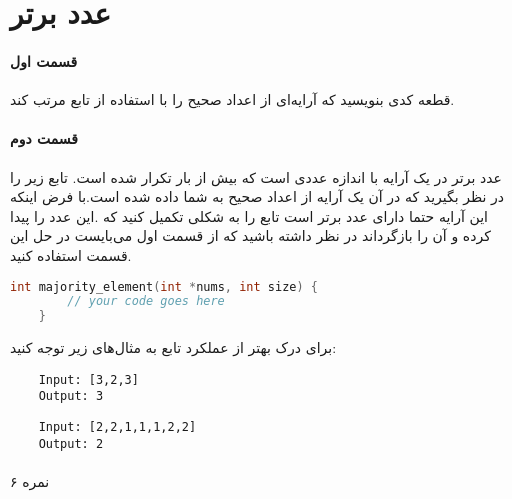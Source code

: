 \documentclass[../main.tex]{subfiles}
\begin{document}
\section{عدد برتر}
\paragraph{قسمت اول}
قطعه کدی بنویسید که آرایه‌ای از اعداد صحیح را با استفاده از تابع
مرتب کند.

\paragraph{قسمت دوم}
عدد برتر در یک آرایه با اندازه 
عددی است که بیش از 
بار تکرار شده است.
تابع زیر را در نظر بگیرید که در آن یک آرایه از اعداد صحیح به شما داده شده است.با فرض اینکه این آرایه حتما دارای عدد برتر است تابع را به شکلی تکمیل کنید که
.این عدد را پیدا کرده و آن را بازگرداند
در نظر داشته باشید که از قسمت اول می‌بایست در حل این قسمت استفاده کنید.

\begin{latin}
\begin{lstlisting}[language=c]
    int majority_element(int *nums, int size) {
        // your code goes here
    }
\end{lstlisting}
\end{latin}

برای درک بهتر از عملکرد تابع به مثال‌های زیر توجه کنید:

\begin{latin}
\begin{verbatim}
    Input: [3,2,3]
    Output: 3
\end{verbatim}

\begin{verbatim}
    Input: [2,2,1,1,1,2,2]
    Output: 2
\end{verbatim}
\end{latin}

\paragraph{}
۶ نمره
\end{document}

